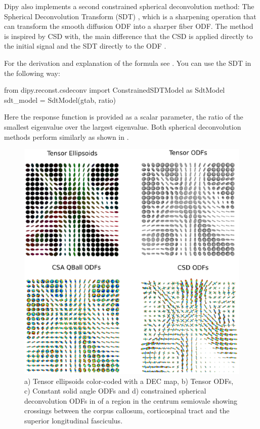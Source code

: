 \documentclass{bioinfo}
\begin{document}
Dipy also implements a second constrained spherical deconvolution method: The
Spherical Deconvolution Transform (SDT)
\citep{descoteaux-deriche-etal:09}, which is a sharpening
operation that can transform the smooth diffusion ODF into a sharper
fiber ODF. The method is
inspired by CSD \cite{tournier-calamante-etal:07} with, the main difference
that the CSD is applied directly to the initial signal and the SDT directly to
the ODF \citep{descoteaux:08,descoteaux-deriche-etal:09}.

For the derivation and explanation of the formula see \cite{descoteaux-deriche-etal:09}. You can use the SDT in the following way:
\begin{python}
from dipy.reconst.csdeconv import
                  ConstrainedSDTModel as SdtModel
sdt_model = SdtModel(gtab, ratio)
\end{python}
Here the response function is provided as a scalar parameter, the ratio of the
smallest eigenvalue over the largest eigenvalue. Both spherical deconvolution
methods perform similarly as shown in
\citep{descoteaux-deriche-etal:09,GaryfallidisISBI2013a}.

\begin{figure}[!htb]
\centerline{\includegraphics[width=180mm]{Figures/ten_csa_csd2.eps}}
\caption{a) Tensor ellipsoids color-coded with a DEC map, b) Tensor
  ODFs, c) Constant solid angle ODFs and d) constrained
  spherical deconvolution ODFs in of a region in the
centrum semiovale showing crossings between the corpus callosum,
corticospinal tract and the superior longitudinal
fasciculus.\label{Fig:ten_csa_csd}}
\end{figure}
\end{document}

